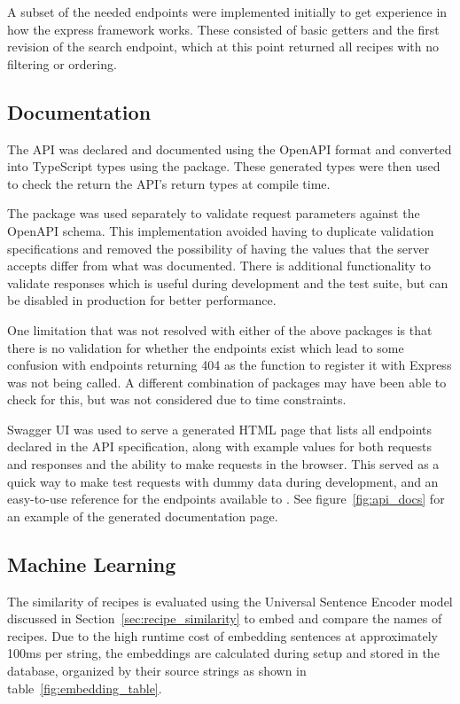 A subset of the needed endpoints were implemented initially to get experience in how the express framework works.
These consisted of basic getters and the first revision of the search endpoint, which at this point returned all
recipes with no filtering or ordering.

\subsection{Documentation}
The API was declared and documented using the OpenAPI format and converted
into TypeScript types using the  package. These
generated types were then used to check the return the API's return types at compile time.

The  package was used separately to validate
request parameters against the OpenAPI schema. This implementation avoided having
to duplicate validation specifications and removed the possibility of having the values that
the server accepts differ from what was documented. There is additional functionality to validate
responses which is useful during development and the test suite, but can be disabled in production
for better performance.

One limitation that was not resolved with either of the above packages is that there is no validation
for whether the endpoints exist which lead to some confusion with endpoints returning 404 as the function to
register it with Express was not being called. A different combination of packages may have been able to check for this,
but was not considered due to time constraints.

Swagger UI was used to serve a generated HTML page that lists all endpoints declared in
the API specification, along with example values for both requests and responses and the ability to make requests in
the browser. This served as a quick way to make test requests with dummy data during development, and an easy-to-use
reference for the endpoints available to . See figure~\ref{fig:api_docs} for an example of the
generated documentation page.

\subsection{Machine Learning}
The similarity of recipes is evaluated using the Universal Sentence Encoder model discussed in Section~\ref{sec:recipe_similarity} to
embed and compare the names of recipes. Due to the high runtime cost of embedding sentences at approximately 100ms per string,
the embeddings are calculated during setup and stored in the database, organized by their source strings as shown in table~\ref{fig:embedding_table}.


